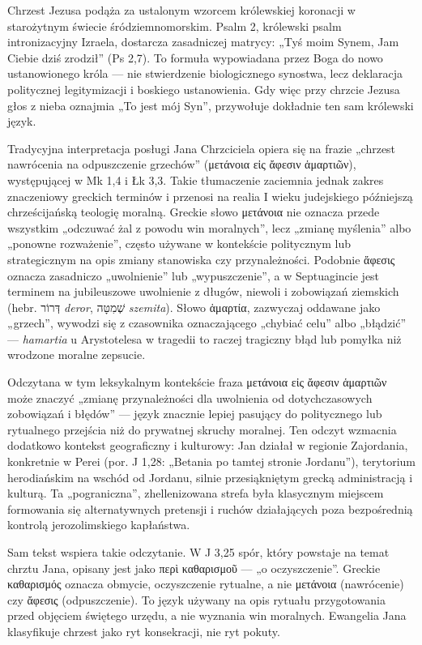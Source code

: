 Chrzest Jezusa podąża za ustalonym wzorcem królewskiej koronacji w starożytnym świecie śródziemnomorskim.
Psalm 2, królewski psalm intronizacyjny Izraela, dostarcza zasadniczej matrycy: „Tyś moim Synem, Jam Ciebie dziś zrodził” (Ps 2,7).
To formuła wypowiadana przez Boga do nowo ustanowionego króla — nie stwierdzenie biologicznego synostwa, lecz deklaracja politycznej legitymizacji i boskiego ustanowienia.
Gdy więc przy chrzcie Jezusa głos z nieba oznajmia „To jest mój Syn”, przywołuje dokładnie ten sam królewski język.

Tradycyjna interpretacja posługi Jana Chrzciciela opiera się na frazie „chrzest nawrócenia na odpuszczenie grzechów” (μετάνοια εἰς ἄφεσιν ἁμαρτιῶν), występującej w Mk 1,4 i Łk 3,3.
Takie tłumaczenie zaciemnia jednak zakres znaczeniowy greckich terminów i przenosi na realia I wieku judejskiego późniejszą chrześcijańską teologię moralną.
Greckie słowo μετάνοια nie oznacza przede wszystkim „odczuwać żal z powodu win moralnych”, lecz „zmianę myślenia” albo „ponowne rozważenie”, często używane w kontekście politycznym lub strategicznym na opis zmiany stanowiska czy przynależności.
Podobnie ἄφεσις oznacza zasadniczo „uwolnienie” lub „wypuszczenie”, a w Septuagincie jest terminem na jubileuszowe uwolnienie z długów, niewoli i zobowiązań ziemskich (hebr. \texthebrew{דְּרוֹר} \textit{deror}, \texthebrew{שְׁמִטָּה} \textit{szemita}).
Słowo ἁμαρτία, zazwyczaj oddawane jako „grzech”, wywodzi się z czasownika oznaczającego „chybiać celu” albo „błądzić” — \textit{hamartia} u Arystotelesa w tragedii to raczej tragiczny błąd lub pomyłka niż wrodzone moralne zepsucie.

Odczytana w tym leksykalnym kontekście fraza μετάνοια εἰς ἄφεσιν ἁμαρτιῶν może znaczyć „zmianę przynależności dla uwolnienia od dotychczasowych zobowiązań i błędów” — język znacznie lepiej pasujący do politycznego lub rytualnego przejścia niż do prywatnej skruchy moralnej.
Ten odczyt wzmacnia dodatkowo kontekst geograficzny i kulturowy: Jan działał w regionie Zajordania, konkretnie w Perei (por. J 1,28: „Betania po tamtej stronie Jordanu”), terytorium herodiańskim na wschód od Jordanu, silnie przesiąkniętym grecką administracją i kulturą.
Ta „pograniczna”, zhellenizowana strefa była klasycznym miejscem formowania się alternatywnych pretensji i ruchów działających poza bezpośrednią kontrolą jerozolimskiego kapłaństwa.

Sam tekst wspiera takie odczytanie.
W J 3,25 spór, który powstaje na temat chrztu Jana, opisany jest jako περὶ καθαρισμοῦ — „o oczyszczenie”.
Greckie καθαρισμός oznacza obmycie, oczyszczenie rytualne, a nie μετάνοια (nawrócenie) czy ἄφεσις (odpuszczenie).
To język używany na opis rytuału przygotowania przed objęciem świętego urzędu, a nie wyznania win moralnych.
Ewangelia Jana klasyfikuje chrzest jako ryt konsekracji, nie ryt pokuty.

